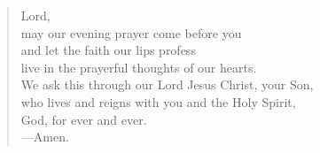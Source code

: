 \prayer

\setlength{\leftmargini}{\prayerleftmargini}

\begin{verse}
Lord,\\
may our evening prayer come before you\\
and let the faith our lips profess\\
live in the prayerful thoughts of our hearts.\\
We ask this through our Lord Jesus Christ, your Son,\\
who lives and reigns with you and the Holy Spirit,\\
God, for ever and ever.\\
{\color{red}---\thinspace}Amen.
\end{verse}

\setlength{\leftmargini}{\defleftmargini}